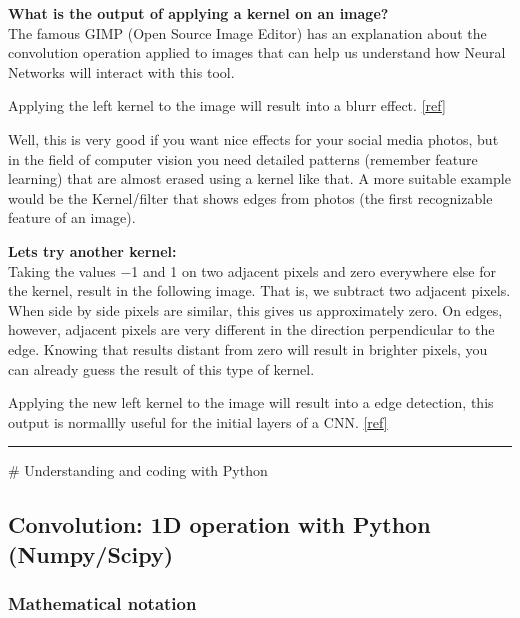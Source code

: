 \documentclass[11pt]{article}
\begin{document}
\textbf{What is the output of applying a kernel on an image?}\\
The famous GIMP (Open Source Image Editor) has an explanation about the
convolution operation applied to images that can help us understand how
Neural Networks will interact with this tool.

    Applying the left kernel to the image will result into a blurr effect.
\href{http://colah.github.io/posts/2014-07-Understanding-Convolutions/}{{[}ref{]}}

Well, this is very good if you want nice effects for your social media
photos, but in the field of computer vision you need detailed patterns
(remember feature learning) that are almost erased using a kernel like
that. A more suitable example would be the Kernel/filter that shows
edges from photos (the first recognizable feature of an image).

\textbf{Lets try another kernel: }\\
Taking the values −1 and 1 on two adjacent pixels and zero everywhere
else for the kernel, result in the following image. That is, we subtract
two adjacent pixels. When side by side pixels are similar, this gives us
approximately zero. On edges, however, adjacent pixels are very
different in the direction perpendicular to the edge. Knowing that
results distant from zero will result in brighter pixels, you can
already guess the result of this type of kernel.

    Applying the new left kernel to the image will result into a edge
detection, this output is normallly useful for the initial layers of a
CNN.
\href{http://colah.github.io/posts/2014-07-Understanding-Convolutions/}{{[}ref{]}}

    \begin{center}\rule{0.5\linewidth}{\linethickness}\end{center}

     \# Understanding and coding with Python

    \subsection{Convolution: 1D operation with Python
(Numpy/Scipy)}\label{convolution-1d-operation-with-python-numpyscipy}

    \subsubsection{Mathematical notation}\label{mathematical-notation}
\end{document}
